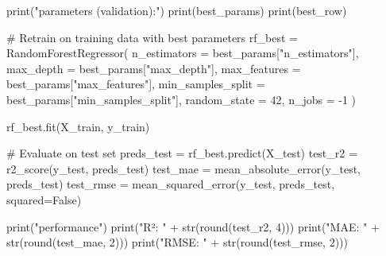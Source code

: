 print("\nBest parameters (validation):")
print(best_params)
print(best_row)

# Retrain on training data with best parameters
rf_best = RandomForestRegressor(
    n_estimators = best_params["n_estimators"],
    max_depth = best_params["max_depth"],
    max_features = best_params["max_features"],
    min_samples_split = best_params["min_samples_split"],
    random_state = 42,
    n_jobs = -1
)

rf_best.fit(X_train, y_train)

# Evaluate on test set
preds_test = rf_best.predict(X_test)
test_r2 = r2_score(y_test, preds_test)
test_mae = mean_absolute_error(y_test, preds_test)
test_rmse = mean_squared_error(y_test, preds_test, squared=False)

print("\nTest performance")
print("R²:   " + str(round(test_r2, 4)))
print("MAE:  " + str(round(test_mae, 2)))
print("RMSE: " + str(round(test_rmse, 2)))